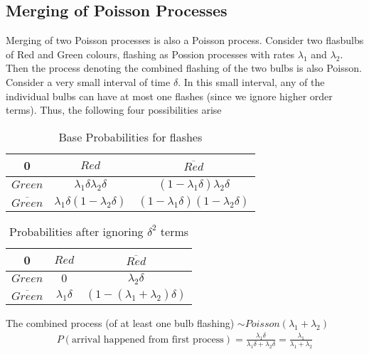 \documentclass[../../probability-notes.tex]{subfiles}
\begin{document}
    \subsection{Merging of Poisson Processes}
    Merging of two Poisson processes is also a Poisson process. Consider two flasbulbs of Red and Green colours, flashing as Possion processes with rates $\lambda_{1}$ and $\lambda_{2}$. Then the process denoting the combined flashing of the two bulbs is also Poisson.\newline
    Consider a very small interval of time $\delta$. In this small interval, any of the individual bulbs can have at most one flashes (since we ignore higher order terms). Thus, the following four possibilities arise \newline
    \begin{table}[h]
    \centering
    \begin{tabular}{c|c|c}
        0 & $Red$ & $\overline{Red}$\\ \hline
        $Green$ & $\lambda_{1} \delta \lambda_{2} \delta $ & $(1-\lambda_{1}\delta)  \lambda_{2} \delta$\\ \hline
        $\overline{Green}$ & $\lambda_{1} \delta (1-\lambda_{2}\delta) $ & $(1-\lambda_{1}\delta) (1-\lambda_{2}\delta)$ \\
    \end{tabular}
    \caption{Base Probabilities for flashes}
    \end{table}
    \begin{table}[h]
    \centering
    \begin{tabular}{c|c|c}
        0 & $Red$ & $\overline{Red}$\\ \hline
        $Green$ & $0$ & $ \lambda_{2} \delta$\\ \hline
        $\overline{Green}$ & $\lambda_{1} \delta$ & $(1-(\lambda_{1} + \lambda_{2}) \delta)$ \\
    \end{tabular}
    \caption{Probabilities after ignoring $\delta^{2}$ terms}
    \end{table}

    The combined process (of at least one bulb flashing) $\sim Poisson(\lambda_{1} + \lambda_{2})$ \newline
    \begin{align*}
    P(\text{arrival happened from first process}) = \frac{\lambda_{1} \delta}{\lambda_{1} \delta + \lambda_2 \delta} = \frac{\lambda_{1}}{\lambda_{1} + \lambda_{2}}
    \end{align*}
\end{document}
